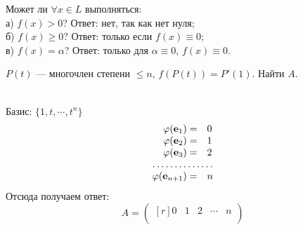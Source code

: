 \begin{prim}
Может ли $ \forall x \in L$ выполняться:\\
а) $f(x)>0$? Ответ: нет, так как нет нуля;\\
б) $f(x)\geq 0$? Ответ: только если $f(x)\equiv0$;\\
в) $f(x)=\alpha $? Ответ: только для $\alpha\equiv0$, $f(x)\equiv0$.\\
\end{prim}
\begin{prim}
$P(t)$ ---  многочлен степени $\leq n$, $f(P(t))=P'(1)$. Найти $A$.
\end{prim}\\
Базис: $\{ 1, t,\cdots, t^n\}$\\
$$
\begin{array}{rl}
\varphi (\text{\textbf{e$_1$}})=&0\\
\varphi (\text{\textbf{e$_2$}})=&1\\
\varphi (\text{\textbf{e$_3$}})=&2\\
\hdotsfor{2}\\
\varphi (\text{\textbf{e$_{n+1}$}})=&n\\
\end{array}
$$
Отсюда получаем ответ:
$$A=
\begin{pmatrix*}[r]
 0 & 1 & 2 & \cdots & n\\
\end{pmatrix*}$$